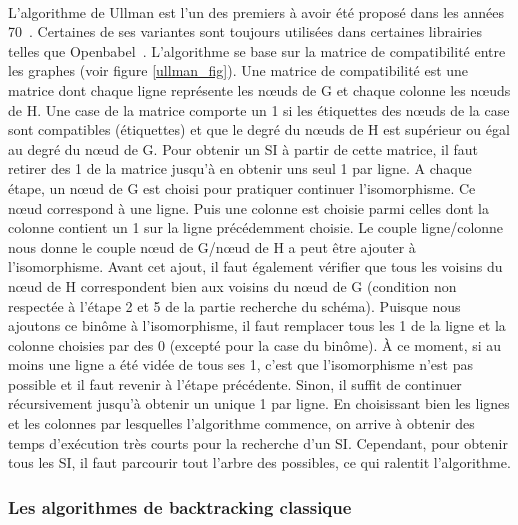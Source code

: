 \documentclass[12pt,french,twoside]{report}
\begin{document}
\paragraph{}L'algorithme de Ullman est l'un des premiers à avoir été proposé dans les années 70~\cite{ullmann_algorithm_1976}.
Certaines de ses variantes sont toujours utilisées dans certaines librairies telles que Openbabel~\cite{oboyle_open_2011}.
L'algorithme se base sur la matrice de compatibilité entre les graphes (voir figure \ref{ullman_fig}).
Une matrice de compatibilité est une matrice dont chaque ligne représente les n\oe{}uds de G et chaque colonne les n\oe{}uds de H.
Une case de la matrice comporte un 1 si les étiquettes des n\oe{}uds de la case sont compatibles (étiquettes) et que le degré du n\oe{}uds de H est supérieur ou égal au degré du n\oe{}ud de G.
Pour obtenir un SI à partir de cette matrice, il faut retirer des 1 de la matrice jusqu'à en obtenir uns seul 1 par ligne.
A chaque étape, un n\oe{}ud de G est choisi pour pratiquer continuer l'isomorphisme.
Ce n\oe{}ud correspond à une ligne.
Puis une colonne est choisie parmi celles dont la colonne contient un 1 sur la ligne précédemment choisie.
Le couple ligne/colonne nous donne le couple n\oe{}ud de G/n\oe{}ud de H a peut être ajouter à l'isomorphisme.
Avant cet ajout, il faut également vérifier que tous les voisins du n\oe{}ud de H correspondent bien aux voisins du n\oe{}ud de G (condition non respectée à l'étape 2 et 5 de la partie recherche du schéma).
Puisque nous ajoutons ce binôme à l'isomorphisme, il faut remplacer tous les 1 de la ligne et la colonne choisies par des 0 (excepté pour la case du binôme).
À ce moment, si au moins une ligne a été vidée de tous ses 1, c'est que l'isomorphisme n'est pas possible et il faut revenir à l'étape précédente.
Sinon, il suffit de continuer récursivement jusqu'à obtenir un unique 1 par ligne.
En choisissant bien les lignes et les colonnes par lesquelles l'algorithme commence, on arrive à obtenir des temps d'exécution très courts pour la recherche d'un SI.
Cependant, pour obtenir tous les SI, il faut parcourir tout l'arbre des possibles, ce qui ralentit l'algorithme.


\subsubsection{Les algorithmes de backtracking classique}
\end{document}
